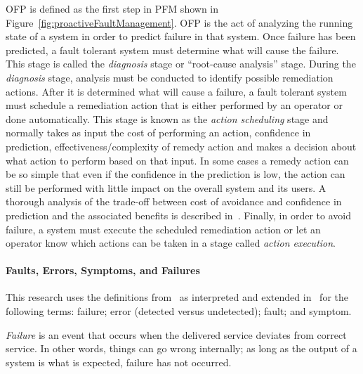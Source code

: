 
\ac{OFP} is defined as the first step in \ac{PFM} shown in
Figure~\ref{fig:proactiveFaultManagement}.  \ac{OFP} is the act of analyzing
the running state of a system in order to predict failure in that system. Once
failure has been predicted, a fault tolerant system must determine what will
cause the failure.  This stage is called the \emph{diagnosis} stage or
``root-cause analysis'' stage.  During the \emph{diagnosis} stage, analysis
must be conducted to identify possible remediation actions.  After it is
determined what will cause a failure, a fault tolerant system must schedule a
remediation action that is either performed by an operator or done
automatically.  This stage is known as the \emph{action scheduling} stage and
normally takes as input the cost of performing an action, confidence in
prediction, effectiveness/complexity of remedy action and makes a decision
about what action to perform based on that input.  In some cases a remedy
action can be so simple that even if the confidence in the prediction is low,
the action can still be performed with little impact on the overall system and
its users.  A thorough analysis of the trade-off between cost of avoidance and
confidence in prediction and the associated benefits is described
in~\cite{candea2004microreboot}.  Finally, in order to avoid failure, a system
must execute the scheduled remediation action or let an operator know which
actions can be taken in a stage called \emph{action execution}.

\paragraph{Faults, Errors, Symptoms, and Failures}
This research uses the definitions from~\cite{avivzienis2004basic} as
interpreted and extended in~\cite{salfnerSurvey} for the following terms:
failure; error (detected versus undetected); fault; and symptom.

\emph{Failure} is an event that occurs when the delivered service deviates from
correct service.  In other words, things can go wrong internally; as long as
the output of a system is what is expected, failure has not occurred.  

